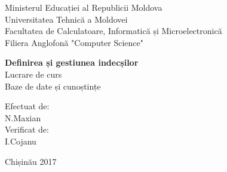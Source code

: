 \begin{titlepage}

\newcommand{\HRule}{\rule{\linewidth}{0.5mm}} %

\center

Ministerul Educației al Republicii Moldova\\ %
Universitatea Tehnică a Moldovei \\%
Facultatea de Calculatoare, Informatică și Microelectronică\\
Filiera Anglofonă "Computer Science"\\


\vspace{6cm}




\begin{center}
\Large \textbf{Definirea și gestiunea indecșilor}\\
\vspace{0.6cm}
Lucrare de curs\\ Baze de date și cunoștințe
\end{center}
\vspace{6cm}


\hfill Efectuat de: \\ \hfill N.Maxian\\
\vspace{0.2cm}
\hfill Verificat de: \\ \hfill I.Cojanu\\
\vspace{0.2cm}



\vfill %
\begin{center}
Chișinău 2017
\end{center}


\end{titlepage}

